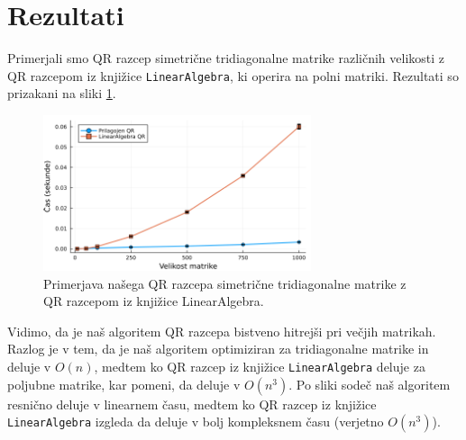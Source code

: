 \documentclass[11pt, titlepage]{article}
\begin{document}
\section{Rezultati}
Primerjali smo QR razcep simetrične tridiagonalne matrike različnih velikosti z QR razcepom iz knjižice \texttt{LinearAlgebra}, ki operira na polni matriki. Rezultati so prizakani na sliki \ref{fig:qr_comparison}.
\begin{figure}[ht]
    \centering
    \includegraphics[width=0.7\textwidth]{figures/qr_performance_comparison.png}
    \caption{Primerjava našega QR razcepa simetrične tridiagonalne matrike z QR razcepom iz knjižice LinearAlgebra.}
    \label{fig:qr_comparison}
\end{figure}

Vidimo, da je naš algoritem QR razcepa bistveno hitrejši pri večjih matrikah. Razlog je v tem, da je naš algoritem optimiziran za tridiagonalne matrike in deluje v $O(n)$, medtem ko QR razcep iz knjižice \texttt{LinearAlgebra} deluje za poljubne matrike, kar pomeni, da deluje v $O(n^3)$.
Po sliki sodeč naš algoritem resnično deluje v linearnem času, medtem ko QR razcep iz knjižice \texttt{LinearAlgebra} izgleda da deluje v bolj kompleksnem času (verjetno $O(n^3)$).
\end{document}
